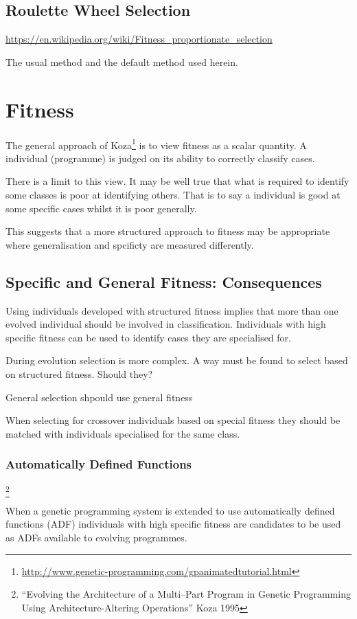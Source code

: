 \documentclass[a4paper,twoside]{article}
\begin{document}
\subsection{Roulette Wheel Selection}

\url{https://en.wikipedia.org/wiki/Fitness_proportionate_selection}

The usual method and the default method used herein.

\section{Fitness}

The general approach of
Koza\footnote{\url{http://www.genetic-programming.com/gpanimatedtutorial.html}}
is to view fitness as a scalar quantity.  A individual (programme) is
judged on its ability to correctly classify cases.

There is a limit to this view.  It may be well true that what is
required to identify some classes is poor at identifying others.
That is to say a individual is good at some specific cases whilst it
is poor generally.

This suggests that a more structured approach to fitness may be
appropriate where generalisation and spcificty are measured
differently.

\subsection{Specific and General Fitness: Consequences}

Using individuals developed with structured fitness implies that more
than one evolved individual should be involved in classification.
Individuals with high specific fitness can be used to identify cases
they are specialised for.

During evolution selection is more complex.  A way must be found to
select based on structured fitness.  Should they?

General selection shpould use general fitness

When selecting for crossover individuals based on special fitness they
should be matched with individuals specialised for the same class.

\subsubsection{Automatically Defined Functions}\footnote{``Evolving
  the Architecture of a Multi--Part Program in Genetic Programming
  Using Architecture-Altering Operations'' Koza 1995}

When a genetic programming system is extended to use automatically
defined functions (ADF) individuals with high specific fitness are
candidates to be used as ADFs available to evolving programmes.
  
\end{document}
